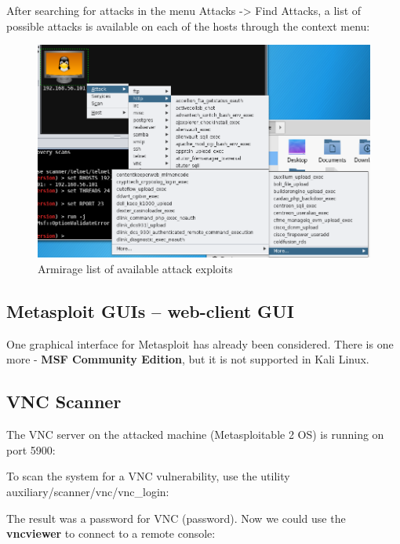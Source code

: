 \documentclass[14pt,a4paper,report]{report}
\begin{document}
After searching for attacks in the menu Attacks -> Find Attacks, a list of possible attacks is available on each of the hosts through the context menu:

\begin{figure}[h!]
	\centering
	\includegraphics[scale = 0.80]{images/4.png}
	\caption{Armirage list of available attack exploits}
\end{figure}


\subsection{Metasploit GUIs – web-client GUI}

One graphical interface for Metasploit has already been considered. There is one more - \textbf{MSF Community Edition}, but it is not supported in Kali Linux.

\subsection{VNC Scanner}

The VNC server on the attacked machine (Metasploitable 2 OS) is running on port 5900:



To scan the system for a VNC vulnerability, use the utility auxiliary/scanner/vnc/vnc\_login:



The result was a password for VNC (password). Now we could use the \textbf{vncviewer} to connect to a remote console:
\end{document}
